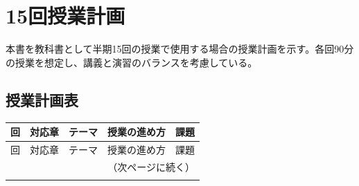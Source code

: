 \chapter{15回授業計画}
\label{app:syllabus}

本書を教科書として半期15回の授業で使用する場合の授業計画を示す。各回90分の授業を想定し、講義と演習のバランスを考慮している。

\section{授業計画表}

\footnotesize
\begin{longtable}{ccp{1.8cm}p{3.3cm}p{1.8cm}}
\toprule
回 & 対応章 & テーマ & 授業の進め方 & 課題 \\
\midrule
\endfirsthead
\toprule
回 & 対応章 & テーマ & 授業の進め方 & 課題 \\
\midrule
\endhead
\midrule
\multicolumn{5}{r}{（次ページに続く）}\\
\endfoot
\bottomrule
\endlastfoot


\end{longtable}
